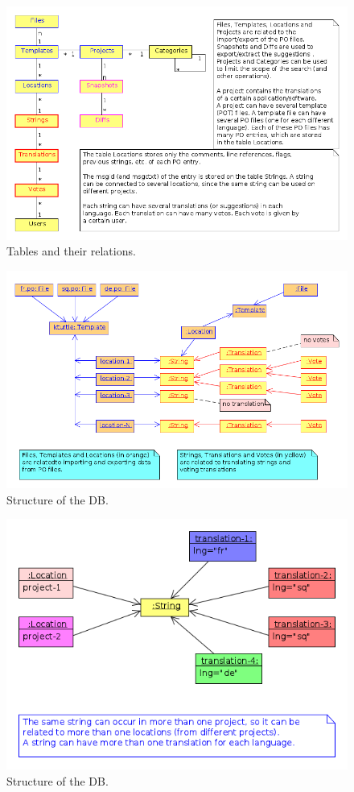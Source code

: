 \documentclass[11pt]{article}
\begin{document}
   \begin{figure}[htb]
\centering
\includegraphics[width=13cm]{./uml/db_diagram.png}
\caption{\label{fig:db_diagram}Tables and their relations.}
\end{figure}

   \begin{figure}[htb]
\centering
\includegraphics[width=13cm]{./uml/object_diagram_1.png}
\caption{\label{fig:object_diagram_1}Structure of the DB.}
\end{figure}

   \begin{figure}[htb]
\centering
\includegraphics[width=12cm]{./uml/object_diagram_2.png}
\caption{\label{fig:object_diagram_2}Structure of the DB.}
\end{figure}
\end{document}
